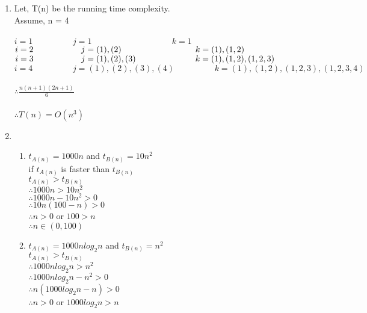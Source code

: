 \documentclass[12pt, a4paper]{article}
\begin{document}
\begin{enumerate}[label=(\alph*)]
 	
 	\item 
 Let, T(n) be the running time complexity.\\
 Assume, n = 4\\
 \\
 $i=1 \hspace{2cm} j=1 \hspace{4cm} k=1$\\
 $i=2 \hspace{2cm} j=(1),(2) \hspace{3.1cm} k=(1),(1,2)$\\
 $i=3 \hspace{2cm} j=(1),(2),(3) \hspace{2.5cm} k=(1),(1,2),(1,2,3)$\\
 $i=4 \hspace{2cm} j=(1),(2),(3),(4) \hspace{2cm} k=(1),(1,2),(1,2,3),(1,2,3,4)$\\
 \\
 $\therefore \frac{n(n+1)(2n+1)}{6}$\\
 \\
 $\therefore T(n) = O(n^{3})$
 	
 	\item 
 	\begin{enumerate}[label=(\roman*)]
 		\item $t_{A(n)} = 1000n$ and $t_{B(n)} = 10n^2$\\
 		if $t_{A(n)}$ is faster than $t_{B(n)} $\\
 		$t_{A(n)} > t_{B(n)} $\\
 		$\therefore 1000n > 10n^2$\\
 		$\therefore 1000n - 10n^2 >0$\\
 		$\therefore 10n(100-n) > 0$\\
 		$\therefore n > 0$ or $100 > n $\\
 		$\therefore n \in (0,100)$\\
 		
 		\item $t_{A(n)} = 1000nlog_2n$ and $t_{B(n)} = n^2$\\
 		$t_{A(n)} > t_{B(n)} $\\
 		$\therefore 1000nlog_2n > n^2$\\
 		$\therefore 1000nlog_2n-n^2 > 0$\\
 		$\therefore n(1000log_2n-n) > 0$\\
 		$\therefore n>0$ or $1000log_2n>n$\\
 		

\end{enumerate}
\end{enumerate}
\end{document}

